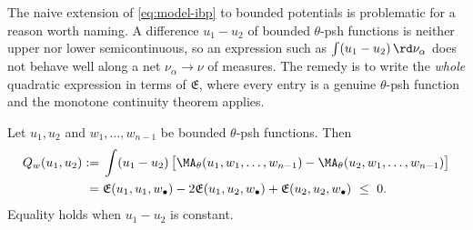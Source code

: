 The naive extension of \eqref{eq:model-ibp} to bounded potentials is
problematic for a reason worth naming.  A difference \(u_1-u_2\) of bounded
\(\theta\)-psh functions is neither upper nor lower semicontinuous, so an
expression such as \(\int(u_1-u_2)\,\rd\nu_\alpha\) does not behave well
along a net \(\nu_\alpha\to\nu\) of measures.  The remedy is to write the
\emph{whole} quadratic expression in terms of \(\mathfrak E\), where every
entry is a genuine \(\theta\)-psh function and the monotone continuity
theorem applies.

\begin{proposition}
\label{prop:ch24-bounded-dirichlet}
Let \(u_1,u_2\) and \(w_1,\ldots,w_{n-1}\) be bounded \(\theta\)-psh
functions.  Then
\begin{equation}
\label{eq:ch24-bounded-dirichlet}
\begin{split}
 Q_w(u_1,u_2)
 :={}&\int(u_1-u_2)\,
   \bigl[\MA_\theta(u_1,w_1,\ldots,w_{n-1})
        -\MA_\theta(u_2,w_1,\ldots,w_{n-1})\bigr]\\
 ={}&\mathfrak E(u_1,u_1,w_\bullet)-2\mathfrak E(u_1,u_2,w_\bullet)
     +\mathfrak E(u_2,u_2,w_\bullet)\ \leq\ 0 .
\end{split}
\end{equation}
Equality holds when \(u_1-u_2\) is constant.
\end{proposition}


